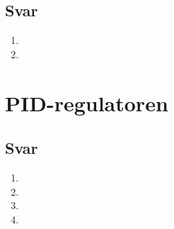 \documentclass[answers,11pt]{exam}
\begin{document}
\begin{enumerate}[label=\alph*)]
\begin{tcolorbox}
\begin{enumerate}[label=o\arabic*)]
    \end{enumerate}

  \end{tcolorbox}

  \newpage
  

  \begin{tcolorbox}
    \subsection*{Svar}

    \begin{enumerate}[label=p\arabic*)]
      \item

      \item

    \end{enumerate}

  \end{tcolorbox}

  \newpage
  \section*{PID-regulatoren}

  

  \begin{tcolorbox}
    \subsection*{Svar}

    \begin{enumerate}[label=q\arabic*)]
      \item

      \item

      \item

      \item

    \end{enumerate}

  \end{tcolorbox}

  \newpage

\end{enumerate}
\end{document}
